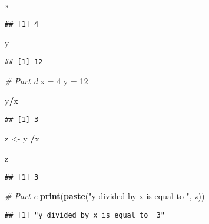 \documentclass[
]{article}
\newenvironment{Shaded}{\begin{snugshade}}{\end{snugshade}}
\newcommand{\CommentTok}[1]{\textcolor[rgb]{0.56,0.35,0.01}{\textit{#1}}}
\newcommand{\DecValTok}[1]{\textcolor[rgb]{0.00,0.00,0.81}{#1}}
\newcommand{\FunctionTok}[1]{\textcolor[rgb]{0.13,0.29,0.53}{\textbf{#1}}}
\newcommand{\NormalTok}[1]{#1}
\newcommand{\OtherTok}[1]{\textcolor[rgb]{0.56,0.35,0.01}{#1}}
\newcommand{\SpecialCharTok}[1]{\textcolor[rgb]{0.81,0.36,0.00}{\textbf{#1}}}
\newcommand{\StringTok}[1]{\textcolor[rgb]{0.31,0.60,0.02}{#1}}
\begin{document}
\begin{Shaded}
\begin{Highlighting}[]
\NormalTok{x}
\end{Highlighting}
\end{Shaded}

\begin{verbatim}
## [1] 4
\end{verbatim}

\begin{Shaded}
\begin{Highlighting}[]
\NormalTok{y}
\end{Highlighting}
\end{Shaded}

\begin{verbatim}
## [1] 12
\end{verbatim}

\begin{Shaded}
\begin{Highlighting}[]
\CommentTok{\# Part d}
\NormalTok{x }\OtherTok{=} \DecValTok{4}
\NormalTok{y }\OtherTok{=} \DecValTok{12}

\NormalTok{y}\SpecialCharTok{/}\NormalTok{x}
\end{Highlighting}
\end{Shaded}

\begin{verbatim}
## [1] 3
\end{verbatim}

\begin{Shaded}
\begin{Highlighting}[]
\NormalTok{z }\OtherTok{\textless{}{-}}\NormalTok{ y }\SpecialCharTok{/}\NormalTok{x}

\NormalTok{z}
\end{Highlighting}
\end{Shaded}

\begin{verbatim}
## [1] 3
\end{verbatim}

\begin{Shaded}
\begin{Highlighting}[]
\CommentTok{\# Part e}
\FunctionTok{print}\NormalTok{(}\FunctionTok{paste}\NormalTok{(}\StringTok{"y divided by x is equal to "}\NormalTok{, z))}
\end{Highlighting}
\end{Shaded}

\begin{verbatim}
## [1] "y divided by x is equal to  3"
\end{verbatim}
\end{document}
